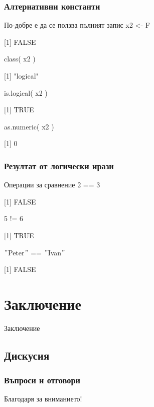 \documentclass{beamer}
\begin{document}
\begin{frame}
\frametitle{Алтернативни константи}
\begin{block}{По-добре е да се ползва пълният запис}
x2 <- F

[1] FALSE

class( x2 )

[1] "logical"

is.logical( x2 )

[1] TRUE

as.numeric( x2 )

[1] 0
\end{block}
\end{frame}

\begin{frame}
\frametitle{Резултат от логически ирази}
\begin{block}{Операции за сравнение}
2 == 3

[1] FALSE

5 != 6

[1] TRUE

$"$Peter$"$ == $"$Ivan$"$

[1] FALSE
\end{block}
\end{frame}

\section{Заключение}

\begin{frame}
\center \huge{Заключение}
\end{frame}

\subsection{Дискусия}

\begin{frame}
\frametitle{Въпроси и отговори}
\center \huge{Благодаря за вниманието!}
\end{frame}
\end{document}

